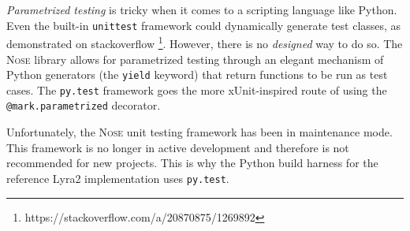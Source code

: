 \emph{Parametrized testing} is tricky when it comes to a scripting language like Python. Even the built-in \texttt{unittest} framework could dynamically generate test classes, as demonstrated on stackoverflow \footnote{https://stackoverflow.com/a/20870875/1269892}. However, there is no \emph{designed} way to do so. The \textsc{Nose} library allows for parametrized testing through an elegant mechanism of Python generators (the \texttt{yield} keyword) that return functions to be run as test cases. The \texttt{py.test} framework goes the more xUnit-inspired route of using the \texttt{@mark.parametrized} decorator.

Unfortunately, the \textsc{Nose} unit testing framework has been in maintenance mode. This framework is no longer in active development and therefore is not recommended for new projects. This is why the Python build harness for the reference Lyra2 implementation uses \texttt{py.test}.

